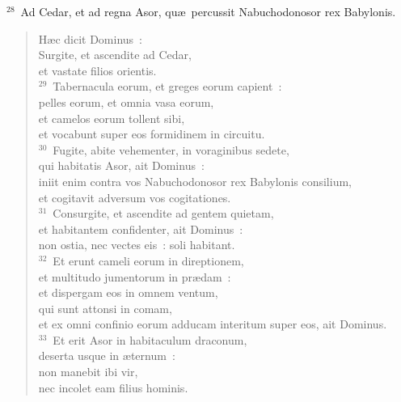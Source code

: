 ${}^{28}$~Ad Cedar, et ad regna Asor, qu\ae\ percussit Nabuchodonosor rex Babylonis. \begin{flushleft}\begin{verse}H\ae c dicit Dominus~:\\ Surgite, et ascendite ad Cedar,\\ et vastate filios orientis.\\
${}^{29}$~Tabernacula eorum, et greges eorum capient~:\\ pelles eorum, et omnia vasa eorum,\\ et camelos eorum tollent sibi,\\ et vocabunt super eos formidinem in circuitu.\\
${}^{30}$~Fugite, abite vehementer, in voraginibus sedete,\\ qui habitatis Asor, ait Dominus~:\\ iniit enim contra vos Nabuchodonosor rex Babylonis consilium,\\ et cogitavit adversum vos cogitationes.\\
${}^{31}$~Consurgite, et ascendite ad gentem quietam,\\ et habitantem confidenter, ait Dominus~:\\ non ostia, nec vectes eis~: soli habitant.\\
${}^{32}$~Et erunt cameli eorum in direptionem,\\ et multitudo jumentorum in pr\ae dam~:\\ et dispergam eos in omnem ventum,\\ qui sunt attonsi in comam,\\ et ex omni confinio eorum adducam interitum super eos, ait Dominus.\\
${}^{33}$~Et erit Asor in habitaculum draconum,\\ deserta usque in \ae ternum~:\\ non manebit ibi vir,\\ nec incolet eam filius hominis.\end{verse}\end{flushleft}


